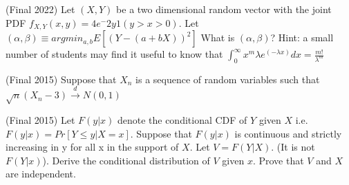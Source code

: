 \documentclass[answers]{exam}
\begin{document}
\begin{questions}

\question (Final 2022) Let $(X,Y)$ be a two dimensional random vector with the joint PDF $f_{X,Y}(x,y) = 4e^-{2y} 1(y>x>0)$. Let $(\alpha, \beta) \equiv argmin_{a,b} E[(Y-(a+bX))^2]$ What is $(\alpha, \beta)$? Hint: a small number of students may find it useful to know that $\int_0^\infty x^m \lambda e^(-\lambda x)dx=\frac{m!}{\lambda^m}$


\question (Final 2015) Suppose that $X_n$ is a sequence of random variables such that $\sqrt{n}(X_n-3) \xrightarrow{d} N(0,1)$

\question (Final 2015) Let $F(y|x)$ denote the conditional CDF of $Y$ given $X$ i.e. $F(y|x) = Pr[Y \leq y|X=x]$. Suppose that $F(y|x)$ is continuous and strictly increasing in y for all x in the support of $X$. Let $V = F(Y|X)$. (It is not $F(Y|x)$). Derive the conditional distribution of $V$ given $x$. Prove that $V$ and $X$ are independent.
\begin{solution} 
\end{solution}


\end{questions}
\end{document}
